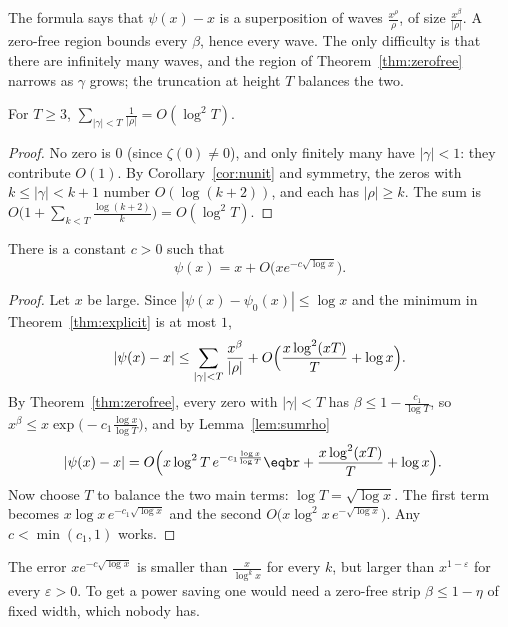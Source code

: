 The formula says that $\psi(x)-x$ is a superposition of waves $\frac{x^\rho}\rho$, of size $\frac{x^\beta}{|\rho|}$. A zero-free region bounds every $\beta$, hence every wave. The only difficulty is that there
are infinitely many waves, and the region of Theorem~\ref{thm:zerofree} narrows as $\gamma$ grows; the truncation at height $T$ balances the two.

\begin{lemma}\label{lem:sumrho}
For $T\ge3$, $\sum_{|\gamma|<T}\frac1{|\rho|}=O(\log^2T)$.
\end{lemma}
\begin{proof}
No zero is $0$ (since $\zeta(0)\ne0$), and only finitely many have $|\gamma|<1$: they contribute $O(1)$. By Corollary~\ref{cor:nunit} and symmetry, the zeros with $k\le|\gamma|<k+1$ number $O(\log(k+2))$, and
each has $|\rho|\ge k$. The sum is $O\bigl(1+\sum_{k<T}\frac{\log(k+2)}k\bigr)=O(\log^2T)$.
\end{proof}

\begin{theorem}\label{thm:pnterror}
There is a constant $c>0$ such that
\[
\psi(x)=x+O\bigl(xe^{-c\sqrt{\log x}}\bigr).
\]
\end{theorem}
\begin{proof}
Let $x$ be large. Since $|\psi(x)-\psi_0(x)|\le\log x$ and the minimum in Theorem~\ref{thm:explicit} is at most $1$,
\[
|\psi(x)-x|\le\sum_{|\gamma|<T}\frac{x^\beta}{|\rho|}+O\Bigl(\frac{x\log^2(xT)}T+\log x\Bigr).
\]
By Theorem~\ref{thm:zerofree}, every zero with $|\gamma|<T$ has $\beta\le1-\frac{c_1}{\log T}$, so $x^\beta\le x\exp\bigl(-c_1\frac{\log x}{\log T}\bigr)$, and by Lemma~\ref{lem:sumrho}
\[
\begin{aligned}|\psi(x)-x|&=O\Bigl(x\log^2T\,e^{-c_1\frac{\log x}{\log T}}\eqbr+\frac{x\log^2(xT)}T+\log x\Bigr).\end{aligned}
\]
Now choose $T$ to balance the two main terms: $\log T=\sqrt{\log x}$. The first term becomes $x\log x\,e^{-c_1\sqrt{\log x}}$ and the second $O\bigl(x\log^2x\,e^{-\sqrt{\log x}}\bigr)$. Any $c<\min(c_1,1)$ works.
\end{proof}

The error $xe^{-c\sqrt{\log x}}$ is smaller than $\frac x{\log^kx}$ for every $k$, but larger than $x^{1-\varepsilon}$ for every $\varepsilon>0$. To get a power saving one would need a zero-free strip
$\beta\le1-\eta$ of fixed width, which nobody has.

